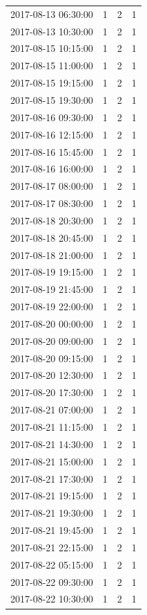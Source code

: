 \begin{tabular}{lrrr}
2017-08-13 06:30:00 & 1 & 2 & 1 \\
2017-08-13 10:30:00 & 1 & 2 & 1 \\
2017-08-15 10:15:00 & 1 & 2 & 1 \\
2017-08-15 11:00:00 & 1 & 2 & 1 \\
2017-08-15 19:15:00 & 1 & 2 & 1 \\
2017-08-15 19:30:00 & 1 & 2 & 1 \\
2017-08-16 09:30:00 & 1 & 2 & 1 \\
2017-08-16 12:15:00 & 1 & 2 & 1 \\
2017-08-16 15:45:00 & 1 & 2 & 1 \\
2017-08-16 16:00:00 & 1 & 2 & 1 \\
2017-08-17 08:00:00 & 1 & 2 & 1 \\
2017-08-17 08:30:00 & 1 & 2 & 1 \\
2017-08-18 20:30:00 & 1 & 2 & 1 \\
2017-08-18 20:45:00 & 1 & 2 & 1 \\
2017-08-18 21:00:00 & 1 & 2 & 1 \\
2017-08-19 19:15:00 & 1 & 2 & 1 \\
2017-08-19 21:45:00 & 1 & 2 & 1 \\
2017-08-19 22:00:00 & 1 & 2 & 1 \\
2017-08-20 00:00:00 & 1 & 2 & 1 \\
2017-08-20 09:00:00 & 1 & 2 & 1 \\
2017-08-20 09:15:00 & 1 & 2 & 1 \\
2017-08-20 12:30:00 & 1 & 2 & 1 \\
2017-08-20 17:30:00 & 1 & 2 & 1 \\
2017-08-21 07:00:00 & 1 & 2 & 1 \\
2017-08-21 11:15:00 & 1 & 2 & 1 \\
2017-08-21 14:30:00 & 1 & 2 & 1 \\
2017-08-21 15:00:00 & 1 & 2 & 1 \\
2017-08-21 17:30:00 & 1 & 2 & 1 \\
2017-08-21 19:15:00 & 1 & 2 & 1 \\
2017-08-21 19:30:00 & 1 & 2 & 1 \\
2017-08-21 19:45:00 & 1 & 2 & 1 \\
2017-08-21 22:15:00 & 1 & 2 & 1 \\
2017-08-22 05:15:00 & 1 & 2 & 1 \\
2017-08-22 09:30:00 & 1 & 2 & 1 \\
2017-08-22 10:30:00 & 1 & 2 & 1 \\

\end{tabular}

